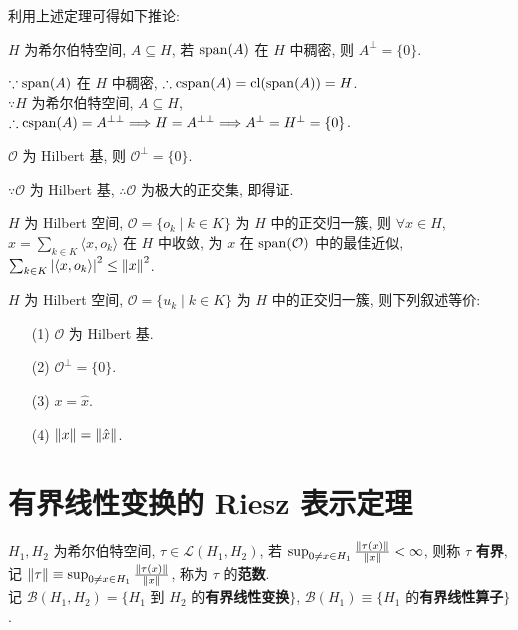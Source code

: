 \documentclass{note}
\begin{document}
利用上述定理可得如下推论:
\begin{thm}[(课本定理 13.14)]
    $H$ 为希尔伯特空间, $A\subseteq H$, 若 $\operatorname{span}(A)$ 在 $H$ 中稠密, 则 $A^{\perp}=\{0\}$.
\end{thm}
\begin{pf}
    $\because\operatorname{span}(A)$ 在 $H$ 中稠密, $\therefore\operatorname{cspan}(A)=\operatorname{cl}(\operatorname{span}(A))=H$.\\
    $\because H$ 为希尔伯特空间, $A\subseteq H$, $\therefore\operatorname{cspan}(A)=A^{\perp\perp}\Longrightarrow H=A^{\perp\perp}\Longrightarrow A^{\perp}=H^{\perp}=\{0\}$.\\
\end{pf}

\begin{thm}[(课本定理 13.15)]
    $\mathcal{O}$ 为 Hilbert 基, 则 $\mathcal{O}^{\perp}=\{0\}$.
\end{thm}
\begin{pf}
    $\because\mathcal{O}$ 为 Hilbert 基, $\therefore\mathcal{O}$ 为极大的正交集, 即得证.
\end{pf}

\begin{thm}[(课本定理 13.25)]
    $H$ 为 Hilbert 空间, $\mathcal{O}=\{o_k\mid k\in K\}$ 为 $H$ 中的正交归一簇, 则 $\forall x\in H$, $\hat{x}=\sum_{k\in K}\langle x,o_k\rangle$ 在 $H$ 中收敛, 为 $x$ 在 $\operatorname{span}(\mathcal{O})$ 中的最佳近似, $\sum_{k\in K}\left\lvert\langle x,o_k\rangle\right\rvert^2\leq\left\lVert x\right\rVert^2$.
\end{thm}

\begin{thm}[(课本定理 13.26)]
    $H$ 为 Hilbert 空间, $\mathcal{O}=\{u_k\mid k\in K\}$ 为 $H$ 中的正交归一簇, 则下列叙述等价:
    \begin{itemize}
        \item[(1)] $\mathcal{O}$ 为 Hilbert 基.
        \item[(2)] $\mathcal{O}^{\perp}=\{0\}$.
        \item[(3)] $x=\hat{x}$.
        \item[(4)] $\left\lVert x\right\rVert=\left\lVert\hat{x}\right\rVert$.
    \end{itemize}
\end{thm}

\section{有界线性变换的 Riesz 表示定理}
\begin{df}[有界线性变换]
    $H_1,H_2$ 为希尔伯特空间, $\tau\in\mathcal{L}(H_1,H_2)$, 若 $\sup_{0\neq x\in H_1}\frac{\left\lVert\tau(x)\right\rVert}{\left\lVert x\right\rVert}<\infty$, 则称 $\tau$ \textbf{有界}, 记 $\left\lVert\tau\right\rVert\equiv\sup_{0\neq x\in H_1}\frac{\left\lVert\tau(x)\right\rVert}{\left\lVert x\right\rVert}$, 称为 $\tau$ 的\textbf{范数}.\\
    记 $\mathcal{B}(H_1,H_2)=\{H_1$ 到 $H_2$ 的\textbf{有界线性变换}$\}$, $\mathcal{B}(H_1)\equiv\{H_1$ 的\textbf{有界线性算子}$\}$.
\end{df}
\end{document}
